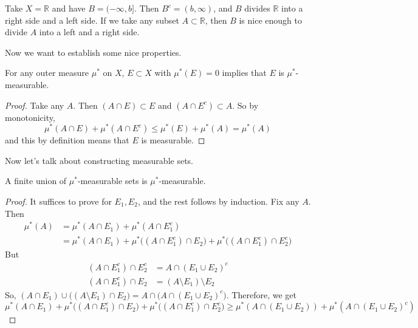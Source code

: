   \begin{example}
    Take $X = \mathbb{R}$ and have $B = (-\infty, b]$. Then $B^c = (b, \infty)$, and $B$ divides $\mathbb{R}$ into a right side and a left side. If we take any subset $A \subset \mathbb{R}$, then $B$ is nice enough to divide $A$ into a left and a right side. 
  \end{example} 

  Now we want to establish some nice properties. 

  \begin{theorem}
    For any outer measure $\mu^\ast$ on $X$, $E \subset X$ with $\mu^\ast (E) = 0$  implies that $E$ is $\mu^\ast$-measurable. 
  \end{theorem}
  \begin{proof}
    Take any $A$. Then $(A \cap E) \subset E$ and $(A \cap E^c) \subset A$. So by monotonicity, 
    \begin{equation}
      \mu^\ast(A \cap E) + \mu^\ast (A \cap E^c) \leq \mu^\ast(E) + \mu^\ast(A) = \mu^\ast (A)
    \end{equation}
    and this by definition means that $E$ is measurable. 
  \end{proof}

  Now let's talk about constructing measurable sets. 

  \begin{theorem}
    A finite union of $\mu^\ast$-measurable sets is $\mu^\ast$-measurable. 
  \end{theorem}
  \begin{proof}
    It suffices to prove for $E_1, E_2$, and the rest follows by induction. Fix any $A$. Then 
    \begin{align}
      \mu^\ast (A) & = \mu^\ast (A \cap E_1) + \mu^\ast (A \cap E_1^c) \\ 
                   & = \mu^\ast (A \cap E_1) + \mu^\ast \big((A \cap E_1^c) \cap E_2 \big) + \mu^\ast \big((A \cap E_1^c) \cap E_2^c \big)
    \end{align}
    But 
    \begin{align}
      (A \cap E_1^c) \cap E_2^c & = A \cap (E_1 \cup E_2)^c \\ 
      (A \cap E_1^c) \cap E_2 & = (A \setminus E_1) \setminus E_2 
    \end{align}
    So, $(A \cap E_1) \cup \big( (A \setminus E_1) \cap E_2 \big) = A \cap \big(A \cap (E_1 \cup E_2)^c \big)$. Therefore, we get 
    \begin{equation}
      \mu^\ast (A \cap E_1) + \mu^\ast \big((A \cap E_1^c) \cap E_2 \big) + \mu^\ast \big((A \cap E_1^c) \cap E_2^c \big) \geq \mu^\ast (A \cap (E_1 \cup E_2)) + \mu^\ast ( A \cap (E_1 \cup E_2)^c ) 
    \end{equation}
  \end{proof} 

